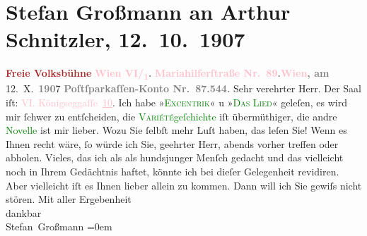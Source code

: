 

               \section[Stefan Großmann an Arthur Schnitzler, 12. 10. 1907]{ Stefan Großmann an Arthur Schnitzler, 12. 10. 1907}\nopagebreak{}\rehead{ }\normalsize\beginnumbering{} \toendnotes[C]{\smallbreak\pagebreak[2]} 
\toendnotes[C]{\smallbreak}\pstart
           \noindent{}{\pb}\textcolor{gray}{\textbf{\textcolor{brown}{Freie Volksbühne}{}\ledrightnote{\textcolor{brown}{Wiener Freie Volksbühne}}}}\pend
           \pstart
           \textcolor{gray}{\textbf{\textcolor{pink}{Wien VI/\textsubscript{1}}{}\ledrightnote{\textcolor{pink}{VI., Mariahilf}}.}}\pend
           \pstart
           \textcolor{gray}{\textbf{\textcolor{pink}{Mariahilferſtraße Nr. 89}{}\ledrightnote{\textcolor{pink}{Mariahilferstraße}}.}}\hfill \textcolor{gray}{\textbf{\textcolor{pink}{Wien}{}\ledrightnote{\textcolor{pink}{Wien}}, am}}{ }12. X. \textcolor{gray}{\textbf{190}}7\pend
           \pstart
           \textcolor{gray}{\textbf{Poſtſparkaſſen-Konto Nr. 87.544.}}\pend
           \pstart{}Sehr verehrter Herr.\pend\pstart
           Der Saal iſt: \textcolor{pink}{VI. Königseggaſſe \uline{10}}{}\ledrightnote{\textcolor{pink}{Königseggasse}}.\pend
           \pstart
           Ich habe »\textsc{\textcolor{green}{Excentrik}{}\ledrightnote{\textcolor{green}{Excentric}}}« u »\textsc{\textcolor{green}{Das Lied}{}\ledrightnote{\textcolor{green}{Das neue Lied}}}« geleſen, es wird mir ſchwer zu entſcheiden, die \textcolor{green}{\textsc{Variété}geſchichte}{} iſt übermüthiger, die andre \textcolor{green}{Novelle}{} ist mir lieber.\pend
           \pstart
           Wozu Sie ſelbſt mehr Luſt haben, das leſen Sie!\pend
           \pstart
           Wenn es Ihnen recht wäre, ſo würde ich Sie, geehrter Herr, abends vorher treffen oder
               abholen.\pend
           \pstart
           Vieles, das ich als als hundsjunger Menſch gedacht und das vielleicht noch in Ihrem
                  {\pb}Gedächtnis haftet,
               könnte ich bei dieſer Gelegenheit revidiren. Aber vielleicht iſt es Ihnen lieber
               allein zu kommen. Dann will ich Sie gewiſs nicht stören.\pend
           \pstart
           Mit aller Ergebenheit{\\[\baselineskip]}dankbar{\\[\baselineskip]}\spacefill\mbox{Stefan Großmann}\pend
           \leftskip=0em{}\endnumbering{}  
      